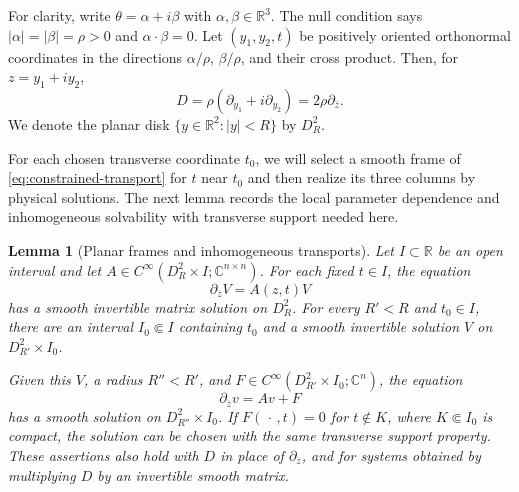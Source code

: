 \documentclass[11pt]{article}
\newcommand{\R}{\mathbb R}
\newcommand{\C}{\mathbb C}
\newcommand{\abs}[1]{\left\lvert #1\right\rvert}
\newtheorem{lemma}[theorem]{Lemma}
\theoremstyle{remark}
\numberwithin{equation}{section}
\begin{document}
For clarity, write $\theta=\alpha+i\beta$ with
$\alpha,\beta\in\R^3$. The null condition says
$\abs\alpha=\abs\beta=\rho>0$ and $\alpha\cdot\beta=0$.
Let $(y_1,y_2,t)$ be positively oriented orthonormal coordinates in
the directions $\alpha/\rho$, $\beta/\rho$, and their cross product.
Then, for $z=y_1+iy_2$,
\[
 D=\rho(\partial_{y_1}+i\partial_{y_2})
    =2\rho\partial_{\overline z}.
\]
We denote the planar disk $\{y\in\R^2:\abs y<R\}$ by $D_R^2$.

For each chosen transverse coordinate $t_0$, we will select a smooth
frame of \eqref{eq:constrained-transport} for $t$ near $t_0$ and then
realize its three columns by physical solutions.
The next lemma records the local parameter dependence and inhomogeneous
solvability with transverse support needed here.

\begin{lemma}[Planar frames and inhomogeneous transports]
\label{lem:planar-frames}
Let $I\subset\R$ be an open interval and let
$A\in C^\infty(D_R^2\times I;\C^{n\times n})$.
For each fixed $t\in I$, the equation
\begin{equation}
\label{eq:planar-frame-equation}
 \partial_{\overline z}V=A(z,t)V
\end{equation}
has a smooth invertible matrix solution on $D_R^2$.
For every $R'<R$ and $t_0\in I$, there are an interval
$I_0\Subset I$ containing $t_0$ and a smooth invertible solution
$V$ on $D_{R'}^2\times I_0$.

Given this $V$, a radius $R''<R'$, and
$F\in C^\infty(D_{R'}^2\times I_0;\C^n)$, the equation
\begin{equation}
\label{eq:planar-inhomogeneous}
 \partial_{\overline z}v=Av+F
\end{equation}
has a smooth solution on $D_{R''}^2\times I_0$. If
$F(\,\cdot\,,t)=0$ for $t\notin K$, where $K\Subset I_0$ is
compact, the solution can be chosen with the same transverse
support property. These assertions also hold with $D$ in place of
$\partial_{\overline z}$, and for systems obtained by multiplying
$D$ by an invertible smooth matrix.
\end{lemma}
\end{document}
